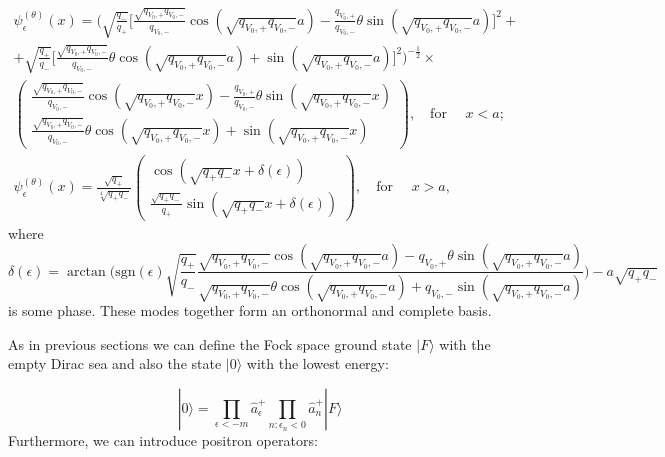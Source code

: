 \documentclass[12pt]{article}
\begin{document}
\begin{eqnarray}
    \psi^{(\theta)}_{\epsilon}(x)=\Big(\sqrt{\frac{q_{-}}{q_{+}}}\Big[\frac{\sqrt{q_{V_0,+}q_{V_0,-}}}{q_{V_0,-}}\cos(\sqrt{q_{V_0,+}q_{V_0,-}}a)-\frac{q_{V_0,+}}{q_{V_0,-}}\theta \sin(\sqrt{q_{V_0,+}q_{V_0,-}}a)\Big]^2+\nonumber \\
	+\sqrt{\frac{q_{+}}{q_{-}}}\Big[\frac{\sqrt{q_{V_0,+}q_{V_0,-}}}{q_{V_0,-}}\theta \cos(\sqrt{q_{V_0,+}q_{V_0,-}}a)+\sin(\sqrt{q_{V_0,+}q_{V_0,-}}a)\Big]^2\Big)^{-\frac{1}{2}}\times \nonumber \\
	\begin{pmatrix}
		\frac{\sqrt{q_{V_0,+}q_{V_0,-}}}{q_{V_0,-}}\cos(\sqrt{q_{V_0,+}q_{V_0,-}}x)-\frac{q_{V_0,+}}{q_{V_0,-}}\theta \sin(\sqrt{q_{V_0,+}q_{V_0,-}}x)\\
		\frac{\sqrt{q_{V_0,+}q_{V_0,-}}}{q_{V_0,-}}\theta \cos(\sqrt{q_{V_0,+}q_{V_0,-}}x)+\sin(\sqrt{q_{V_0,+}q_{V_0,-}}x)
	\end{pmatrix}, \quad \text{for } \quad x<a; \\
\psi^{(\theta)}_{\epsilon}(x)=\frac{\sqrt{q_{+}}}{\sqrt[4]{q_{+}q_{-}}}\begin{pmatrix}
		\cos(\sqrt{q_{+}q_{-}}x+\delta(\epsilon))\\
		\frac{\sqrt{q_{+}q_{-}}}{q_{+}}\sin(\sqrt{q_{+}q_{-}}x+\delta(\epsilon))
	\end{pmatrix},\quad \text{for } \quad x>a, \nonumber 
\end{eqnarray}
where
	\[\delta(\epsilon)=\arctan\Big(\text{sgn}(\epsilon)\sqrt{\frac{q_{+}}{q_{-}}}\frac{\sqrt{q_{V_0,+}q_{V_0,-}}\cos(\sqrt{q_{V_0,+}q_{V_0,-}}a)-q_{V_0,+}\theta \sin(\sqrt{q_{V_0,+}q_{V_0,-}}a)}{\sqrt{q_{V_0,+}q_{V_0,-}}\theta \cos(\sqrt{q_{V_0,+}q_{V_0,-}}a)+q_{V_0,-}\sin(\sqrt{q_{V_0,+}q_{V_0,-}}a)}\Big)-a\sqrt{q_{+}q_{-}}\]
is some phase. These modes together form an orthonormal and complete basis.


As in previous sections we can define the Fock space ground state $|F\rangle$ with the empty Dirac sea and also the state $|0\rangle$ with the lowest energy:

\begin{equation}
|0\rangle=\prod_{\epsilon<-m}\hat{a}^{+}_{\epsilon}\prod_{n:\epsilon_n<0}\hat{a}^{+}_{n}|F\rangle
\end{equation}
Furthermore, we can introduce positron operators:
\end{document}
